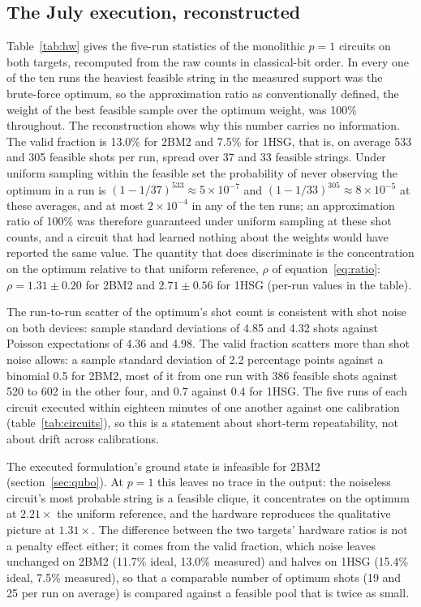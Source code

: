 \documentclass{iopjournal}
\begin{document}
\subsection{The July execution, reconstructed}
\label{sec:res_july}
Table~\ref{tab:hw} gives the five-run statistics of the monolithic $p=1$ circuits on both targets, recomputed from the raw counts in classical-bit order. In every one of the ten runs the heaviest feasible string in the measured support was the brute-force optimum, so the approximation ratio as conventionally defined, the weight of the best feasible sample over the optimum weight, was 100\% throughout. The reconstruction shows why this number carries no information. The valid fraction is 13.0\% for 2BM2 and 7.5\% for 1HSG, that is, on average 533 and 305 feasible shots per run, spread over 37 and 33 feasible strings. Under uniform sampling within the feasible set the probability of never observing the optimum in a run is $(1-1/37)^{533} \approx 5\times10^{-7}$ and $(1-1/33)^{305} \approx 8\times10^{-5}$ at these averages, and at most $2\times10^{-4}$ in any of the ten runs; an approximation ratio of 100\% was therefore guaranteed under uniform sampling at these shot counts, and a circuit that had learned nothing about the weights would have reported the same value. The quantity that does discriminate is the concentration on the optimum relative to that uniform reference, $\rho$ of equation~\eqref{eq:ratio}: $\rho = 1.31 \pm 0.20$ for 2BM2 and $2.71 \pm 0.56$ for 1HSG (per-run values in the table).

The run-to-run scatter of the optimum's shot count is consistent with shot noise on both devices: sample standard deviations of 4.85 and 4.32 shots against Poisson expectations of 4.36 and 4.98. The valid fraction scatters more than shot noise allows: a sample standard deviation of 2.2 percentage points against a binomial 0.5 for 2BM2, most of it from one run with 386 feasible shots against 520 to 602 in the other four, and 0.7 against 0.4 for 1HSG. The five runs of each circuit executed within eighteen minutes of one another against one calibration (table~\ref{tab:circuits}), so this is a statement about short-term repeatability, not about drift across calibrations.

The executed formulation's ground state is infeasible for 2BM2 (section~\ref{sec:qubo}). At $p=1$ this leaves no trace in the output: the noiseless circuit's most probable string is a feasible clique, it concentrates on the optimum at $2.21\times$ the uniform reference, and the hardware reproduces the qualitative picture at $1.31\times$. The difference between the two targets' hardware ratios is not a penalty effect either; it comes from the valid fraction, which noise leaves unchanged on 2BM2 (11.7\% ideal, 13.0\% measured) and halves on 1HSG (15.4\% ideal, 7.5\% measured), so that a comparable number of optimum shots (19 and 25 per run on average) is compared against a feasible pool that is twice as small.
\end{document}
